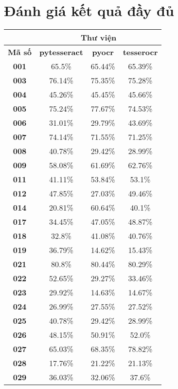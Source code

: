 \documentclass[12pt,a4paper]{article}
\begin{document}
\section{Đánh giá kết quả đầy đủ}

\begin{tabular}{|c|c|c|c|}
\hline & \multicolumn{3}{c|}{Thư viện} \\
\hline \textbf{Mã số} & \textbf{pytesseract} & \textbf{pyocr} & \textbf{tesserocr} \\
\hline \textbf{001} & 65.5\% & 65.44\% & 65.39\% \\
\hline \textbf{003} & 76.14\% & 75.35\% & 75.28\% \\
\hline \textbf{004} & 45.26\% & 45.45\% & 45.66\% \\
\hline \textbf{005} & 75.24\% & 77.67\% & 74.53\% \\
\hline \textbf{006} & 31.01\% & 29.79\% & 43.69\% \\
\hline \textbf{007} & 74.14\% & 71.55\% & 71.25\% \\
\hline \textbf{008} & 40.78\% & 29.42\% & 28.99\% \\
\hline \textbf{009} & 58.08\% & 61.69\% & 62.76\% \\
\hline \textbf{011} & 41.11\% & 53.84\% & 53.1\% \\
\hline \textbf{012} & 47.85\% & 27.03\% & 49.46\% \\
\hline \textbf{014} & 20.81\% & 60.64\% & 40.1\% \\
\hline \textbf{017} & 34.45\% & 47.05\% & 48.87\% \\
\hline \textbf{018} & 32.8\% & 41.08\% & 40.76\% \\
\hline \textbf{019} & 36.79\% & 14.62\% & 15.43\% \\
\hline \textbf{021} & 80.8\% & 80.44\% & 80.29\% \\
\hline \textbf{022} & 52.65\% & 29.27\% & 33.46\% \\
\hline \textbf{023} & 29.92\% & 14.63\% & 14.67\% \\
\hline \textbf{024} & 26.99\% & 27.55\% & 27.52\% \\
\hline \textbf{025} & 40.78\% & 29.42\% & 28.99\% \\
\hline \textbf{026} & 48.15\% & 50.91\% & 52.0\% \\
\hline \textbf{027} & 65.03\% & 68.35\% & 78.82\% \\
\hline \textbf{028} & 17.76\% & 21.22\% & 21.13\% \\
\hline \textbf{029} & 36.03\% & 32.06\% & 37.6\% \\

\end{tabular}
\end{document}
